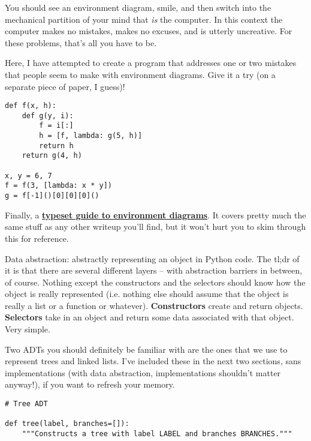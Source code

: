 \documentclass[twoside]{article}
\begin{document}
\begin{enumerate}
You should see an environment diagram, smile, and then switch into the mechanical partition of your mind that \textit{is} the computer. In this context the computer makes no mistakes, makes no excuses, and is utterly uncreative. For these problems, that's all you have to be.

\begin{enumerate}
 Here, I have attempted to create a program that addresses one or two mistakes that people seem to make with environment diagrams. Give it a try (on a separate piece of paper, I guess)!

\begin{lstlisting}
def f(x, h):
    def g(y, i):
        f = i[:]
        h = [f, lambda: g(5, h)]
        return h
    return g(4, h)

x, y = 6, 7
f = f(3, [lambda: x * y])
g = f[-1]()[0][0][0]()
\end{lstlisting}
\end{enumerate}

Finally, a \textbf{\href{http://www-inst.eecs.berkeley.edu/~cs61a/sp13/pdfs/environment-diagrams.pdf}{typeset guide to environment diagrams}}. It covers pretty much the same stuff as any other writeup you'll find, but it won't hurt you to skim through this for reference.


Data abstraction: abstractly representing an object in Python code. The tl;dr of it is that there are several different layers -- with abstraction barriers in between, of course. Nothing except the constructors and the selectors should know how the object is really represented (i.e. nothing else should assume that the object is really a list or a function or whatever). \textbf{Constructors} create and return objects. \textbf{Selectors} take in an object and return some data associated with that object. Very simple.

Two ADTs you should definitely be familiar with are the ones that we use to represent trees and linked lists. I've included these in the next two sections, sans implementations (with data abstraction, implementations shouldn't matter anyway!), if you want to refresh your memory.


\begin{lstlisting}
# Tree ADT

def tree(label, branches=[]):
    """Constructs a tree with label LABEL and branches BRANCHES."""


\end{lstlisting}
\end{enumerate}
\end{document}
